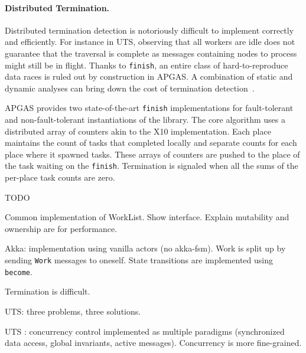 \paragraph{Distributed Termination.} Distributed termination detection is notoriously difficult to implement correctly and efficiently.
For instance in UTS, observing that all workers are idle does not guarantee that the traversal is complete as messages containing nodes to process might still be in flight. Thanks to \lstinline{finish}, an entire class of hard-to-reproduce data races is ruled out by construction in APGAS.
A combination of static and dynamic analyses can bring down the cost of termination detection~\cite{TardieuETAL14X10ApgasAtPetascale}. 

APGAS provides two state-of-the-art \lstinline{finish} implementations for fault-tolerant and non-fault-tolerant instantiations of the library. The core algorithm uses a distributed array of counters akin to the X10 implementation. Each place maintains the count of tasks that completed locally and separate counts for each place where it spawned tasks. These arrays of counters are pushed to the place of the task waiting on the \lstinline{finish}. Termination is signaled when all the sums of the per-place task counts are zero.


TODO

Common implementation of WorkList. Show interface. Explain mutability and
ownership are for performance.

Akka: implementation using vanilla actors (no akka-fsm). Work is split up by
sending \lstinline{Work} messages to oneself. State transitions are implemented
using \lstinline{become}.

Termination is difficult.

UTS: three problems, three solutions.

UTS \apgas: concurrency control implemented as multiple paradigms (synchronized
data access, global invariants, active messages). Concurrency is more
fine-grained.

